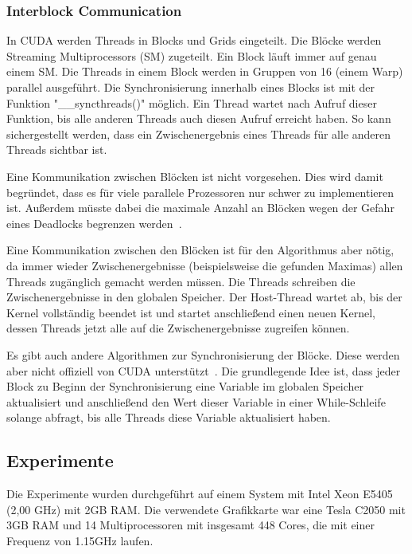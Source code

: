 \documentclass[ngerman]{scrartcl}
\begin{document}
\subsubsection{Interblock Communication}
In CUDA werden Threads in Blocks und Grids eingeteilt.
Die Blöcke werden Streaming Multiprocessors (SM) zugeteilt.
Ein Block läuft immer auf genau einem SM.
Die Threads in einem Block werden in Gruppen von 16 (einem Warp) parallel ausgeführt.
Die Synchronisierung innerhalb eines Blocks ist mit der Funktion "\_\_syncthreads()" möglich.
Ein Thread wartet nach Aufruf dieser Funktion, bis alle anderen Threads auch diesen Aufruf erreicht haben.
So kann sichergestellt werden, dass ein Zwischenergebnis eines Threads für alle anderen Threads sichtbar ist.

Eine Kommunikation zwischen Blöcken ist nicht vorgesehen.
Dies wird damit begründet, dass es für viele parallele Prozessoren nur schwer zu implementieren ist.
Außerdem müsste dabei die maximale Anzahl an Blöcken wegen der Gefahr eines Deadlocks begrenzen werden~\cite{parallelreduction}.

Eine Kommunikation zwischen den Blöcken ist für den Algorithmus aber nötig, da immer wieder Zwischenergebnisse (beispielsweise die gefunden Maximas) allen Threads zugänglich gemacht werden müssen.
Die Threads schreiben die Zwischenergebnisse in den globalen Speicher. Der Host-Thread wartet ab, bis der Kernel vollständig beendet ist und startet anschließend einen neuen Kernel, dessen Threads jetzt alle auf die Zwischenergebnisse zugreifen können.

Es gibt auch andere Algorithmen zur Synchronisierung der Blöcke. Diese werden aber nicht offiziell von CUDA unterstützt~\cite{interblockgpusync}.
Die grundlegende Idee ist, dass jeder Block zu Beginn der Synchronisierung eine Variable im globalen Speicher aktualisiert und anschließend den Wert dieser Variable in einer While-Schleife solange abfragt, bis alle Threads diese Variable aktualisiert haben.
\subsection{Experimente}
Die Experimente wurden durchgeführt auf einem System mit Intel Xeon E5405 (2,00 GHz) mit 2GB RAM. 
Die verwendete Grafikkarte war eine Tesla C2050 mit 3GB RAM und 14 Multiprocessoren mit insgesamt 448 Cores, 
die mit einer Frequenz von 1.15GHz laufen. 
\end{document}
